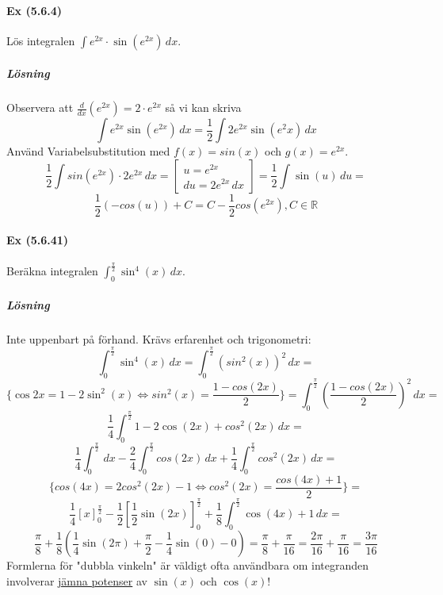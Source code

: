 \paragraph*{Ex (5.6.4)} Lös integralen $\int e^{2x}\cdot \sin(e^{2x})\, dx$.
\subparagraph*{Lösning}
Observera att $\frac{d}{dx}(e^{2x})=2\cdot e^{2x}$ så vi kan skriva
\begin{equation*}
    \int e^{2x}\sin(e^{2x})\, dx=
    \frac{1}{2}\int 2e^{2x}\sin(e^2x)\, dx
\end{equation*}
Använd Variabelsubstitution med $f(x)=sin(x)$ och $g(x)=e^{2x}$.
\begin{equation*}
    \frac{1}{2}\int sin(e^{2x})\cdot 2e^{2x}\, dx=
    \begin{bmatrix}
        u=e^{2x} \\
        du=2e^{2x}\, dx
    \end{bmatrix}=
    \frac{1}{2}\int \sin(u)\, du=
\end{equation*}
\begin{equation*}
    \frac{1}{2}(-cos(u))+C=
    C-\frac{1}{2}cos(e^{2x}), C\in\mathbb{R}
\end{equation*}

\paragraph*{Ex (5.6.41)} Beräkna integralen $\int_0^{\frac{\pi}{2}}\sin^4(x)\, dx$.
\subparagraph{Lösning}
Inte uppenbart på förhand.
Krävs erfarenhet och trigonometri:
\begin{equation*}
    \int_0^{\frac{\pi}{2}}\sin^4(x)\, dx=
    \int_0^{\frac{\pi}{2}}(sin^2(x))^2\, dx=
\end{equation*}
\begin{equation*}
    \{\cos 2x=1-2\sin^2(x)\Leftrightarrow sin^2(x)=\frac{1-cos(2x)}{2}\}=
    \int_0^{\frac{\pi}{2}}(\frac{1-cos(2x)}{2})^2\, dx=
\end{equation*}
\begin{equation*}
    \frac{1}{4}\int_0^{\frac{\pi}{2}}1-2\cos(2x)+cos^2(2x)\, dx=
\end{equation*}
\begin{equation*}
    \frac{1}{4}\int_0^{\frac{\pi}{2}}\, dx-\frac{2}{4}\int_0^{\frac{\pi}{2}}cos(2x)\, dx+\frac{1}{4}\int_0^{\frac{\pi}{2}}cos^2(2x)\, dx=
\end{equation*}
\begin{equation*}
    \{cos(4x)=2cos^2(2x)-1\Leftrightarrow cos^2(2x)=\frac{cos(4x)+1}{2}\}=
\end{equation*}
\begin{equation*}
    \frac{1}{4}[x]_0^{\frac{\pi}{2}}-\frac{1}{2}[\frac{1}{2}\sin(2x)]_0^\frac{\pi}{2}+\frac{1}{8}\int_0^\frac{\pi}{2}\cos(4x)+1\, dx=
\end{equation*}
\begin{equation*}
    \frac{\pi}{8}+\frac{1}{8}(\frac{1}{4}\sin(2\pi)+\frac{\pi}{2}-\frac{1}{4}\sin(0)-0)=
    \frac{\pi}{8}+\frac{\pi}{16}=
    \frac{2\pi}{16}+\frac{\pi}{16}=
    \frac{3\pi}{16}
\end{equation*}
Formlerna för "dubbla vinkeln" är väldigt ofta användbara om integranden involverar \underline{jämna potenser} av $\sin(x)$ och $\cos(x)$!

